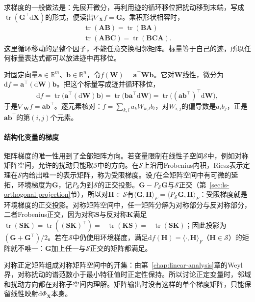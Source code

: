 求梯度的一般做法是：先展开微分，再利用迹的循环移位把扰动移到末端，写成$\operatorname{tr}(\bm G^\top\mathrm d\bm X)$的形式，便读出$\nabla_{\bm X}f=\bm G$。乘积形状相容时，
\[
 \begin{gathered}
\operatorname{tr}(\bm A\bm B)=\operatorname{tr}(\bm B\bm A)\\
\operatorname{tr}(\bm A\bm B\bm C)=\operatorname{tr}(\bm B\bm C\bm A).
 \end{gathered}
\]
这里循环移动的是整个因子，不能任意交换相邻矩阵。标量等于自己的迹，所以任何标量表达式都可以放进迹中再移位。
\begin{example}[双线性函数的矩阵梯度]
\label{ex:multivariable-bilinear-matrix-gradient}
对固定向量$\bm a\in\mathbb R^m$、$\bm b\in\mathbb R^n$，令$f(\bm W)=\bm a^\top\bm W\bm b$。它对$\bm W$线性，微分为$\mathrm df=\bm a^\top(\mathrm d\bm W)\bm b$。把这个标量写成迹并循环移位，
\[
 \mathrm df=\operatorname{tr}\bigl(\bm a^\top(\mathrm d\bm W)\bm b\bigr)=\operatorname{tr}\bigl(\bm b\bm a^\top\mathrm d\bm W\bigr)
 =\operatorname{tr}\bigl((\bm a\bm b^\top)^\top\mathrm d\bm W\bigr),
\]
于是$\nabla_{\bm W}f=\bm a\bm b^\top$。逐元素核对：$f=\sum_{k,l}a_kW_{k,l}b_l$，对$W_{i,j}$的偏导数是$a_ib_j$，正是$\bm a\bm b^\top$的第$(i,j)$个元素。
\end{example}

\paragraph{结构化变量的梯度}
矩阵梯度的唯一性用到了全部矩阵方向。若变量限制在线性子空间$\mathcal S$中，例如对称矩阵空间，允许的扰动只能取$\mathcal S$中的方向。在$\mathcal S$上沿用Frobenius内积，Riesz表示定理在$\mathcal S$内给出唯一的表示矩阵，称为受限梯度。设$f$在全矩阵空间中有可微的延拓，环境梯度为$\bm G$，记$P_{\mathcal S}$为到$\mathcal S$的正交投影。$\bm G-P_{\mathcal S}\bm G$与$\mathcal S$正交（第~\ref{sec:ls-orthogonal-projection}节），所以对$\bm H\in\mathcal S$有$\langle\bm G,\bm H\rangle_F=\langle P_{\mathcal S}\bm G,\bm H\rangle_F$：受限梯度就是环境梯度的正交投影。对称矩阵空间中，任一矩阵分解为对称部分与反对称部分，二者Frobenius正交，因为对称$\bm S$与反对称$\bm K$满足$\operatorname{tr}(\bm S\bm K)=\operatorname{tr}((\bm S\bm K)^\top)=-\operatorname{tr}(\bm K\bm S)=-\operatorname{tr}(\bm S\bm K)$；因此投影为$(\bm G+\bm G^\top)/2$。若在$\mathcal S$中仍使用环境梯度，满足$\mathrm df(\bm H)=\langle\cdot,\bm H\rangle_F$（$\bm H\in\mathcal S$）的矩阵就不唯一：$\bm G$加上任一与$\mathcal S$正交的矩阵都满足。

对称正定矩阵组成对称矩阵空间中的开集：由第~\ref{chap:linear-analysis}章的Weyl界，对称扰动的谱范数小于最小特征值时正定性保持。所以讨论正定变量时，邻域和扰动方向都在对称子空间内理解。矩阵输出时没有这样的单个梯度矩阵，只能保留线性映射$\mathrm d\Phi_{\bm X}$本身。

